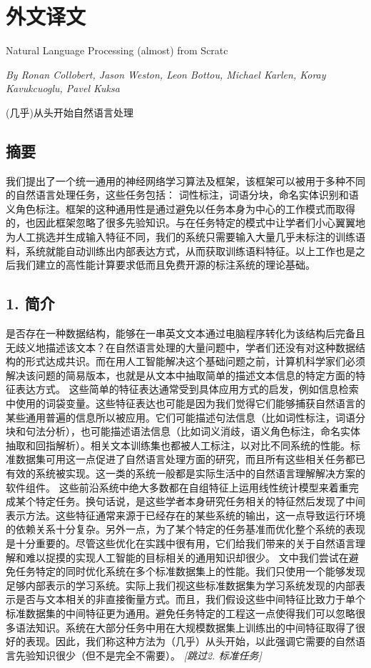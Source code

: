 \chapter*{外\quad 文\quad 译\quad 文}
\pagestyle{empty}

\begin{center}
{\heiti{}Natural Language Processing (almost) from Scratc

\textsl{By Ronan Collobert, Jason Weston, Leon Bottou, Michael Karlen, Koray Kavukcuoglu, Pavel Kuksa}

\heiti (几乎)从头开始自然语言处理
}
\end{center}


\section*{摘要}
我们提出了一个统一通用的神经网络学习算法及框架，该框架可以被用于多种不同的自然语言处理任务，这些任务包括： 词性标注，词语分块，命名实体识别和语义角色标注。框架的这种通用性是通过避免以任务本身为中心的工作模式而取得的，也因此框架忽略了很多先验知识。与在任务特定的模式中让学者们小心翼翼地为人工挑选并生成输入特征不同，我们的系统只需要输入大量几乎未标注的训练语料，系统就能自动训练出内部表达方式，从而获取训练语料特征。以上工作也是之后我们建立的高性能计算要求低而且免费开源的标注系统的理论基础。
\section*{1. 简介}
是否存在一种数据结构，能够在一串英文文本通过电脑程序转化为该结构后完备且无歧义地描述该文本？在自然语言处理的大量问题中，学者们还没有对这种数据结构的形式达成共识。而在用人工智能解决这个基础问题之前，计算机科学家们必须解决该问题的简易版本，也就是从文本中抽取简单的描述文本信息的特定方面的特征表达方式。
这些简单的特征表达通常受到具体应用方式的启发，例如信息检索中使用的词袋变量。这些特征表达也可能是因为我们觉得它们能够捕获自然语言的某些通用普遍的信息所以被应用。它们可能描述句法信息（比如词性标注，词语分块和句法分析），也可能描述语法信息（比如词义消歧，语义角色标注，命名实体抽取和回指解析）。相关文本训练集也都被人工标注，以对比不同系统的性能。标准数据集可用这一点促进了自然语言处理方面的研究，而且所有这些相关任务都已有效的系统被实现。这一类的系统一般都是实际生活中的自然语言理解解决方案的软件组件。
这些前沿系统中绝大多数都在自组特征上运用线性统计模型来着重完成某个特定任务。换句话说，是这些学者本身研究任务相关的特征然后发现了中间表示方法。这些特征通常来源于已经存在的某些系统的输出，这一点导致运行环境的依赖关系十分复杂。另外一点，为了某个特定的任务基准而优化整个系统的表现是十分重要的。尽管这些优化在实践中很有用，它们给我们带来的关于自然语言理解和难以捉摸的实现人工智能的目标相关的通用知识却很少。
文中我们尝试在避免任务特定的同时优化系统在多个标准数据集上的性能。我们只使用一个能够发现足够内部表示的学习系统。实际上我们视这些标准数据集为学习系统发现的内部表示是否与文本相关的非直接衡量方式。而且，我们假设这些中间特征比致力于单个标准数据集的中间特征更为通用。避免任务特定的工程这一点使得我们可以忽略很多语法知识。系统在大部分任务中用在大规模数据集上训练出的中间特征取得了很好的表现。因此，我们称这种方法为（几乎）从头开始，以此强调它需要的自然语言先验知识很少（但不是完全不需要）。
\textit{[跳过2. 标准任务]}
